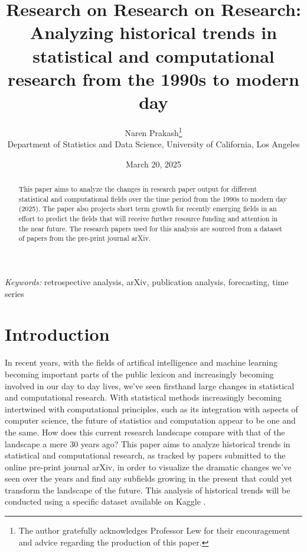\documentclass[
  12pt]{article}
\begin{document}
\def\spacingset#1{\renewcommand{\baselinestretch}%
{#1}\small\normalsize} \spacingset{1}



\date{March 20, 2025}
\title{\bf Research on Research on Research: Analyzing historical trends
in statistical and computational research from the 1990s to modern day}
\author{
Naren Prakash\thanks{The author gratefully acknowledges Professor Lew
for their encouragement and advice regarding the production of this
paper.}\\
Department of Statistics and Data Science, University of California, Los
Angeles\\
}
\maketitle

\bigskip
\bigskip
\begin{abstract}
This paper aims to analyze the changes in research paper output for
different statistical and computational fields over the time period from
the 1990s to modern day (2025). The paper also projects short term
growth for recently emerging fields in an effort to predict the fields
that will receive further resource funding and attention in the near
future. The research papers used for this analysis are sourced from a
dataset of papers from the pre-print journal arXiv.
\end{abstract}

\noindent%
{\it Keywords:} retrospective analysis, arXiv, publication analysis,
forecasting, time series
\vfill

\newpage
\spacingset{1.9} %


\section{Introduction}\label{sec-intro}

In recent years, with the fields of artifical intelligence and machine
learning becoming important parts of the public lexicon and increasingly
becoming involved in our day to day lives, we've seen firsthand large
changes in statistical and computational research. With statistical
methods increasingly becoming intertwined with computational principles,
such as its integration with aspects of computer science, the future of
statistics and computation appear to be one and the same. How does this
current research landscape compare with that of the landscape a mere 30
years ago? This paper aims to analyze historical trends in statistical
and computational research, as tracked by papers submitted to the online
pre-print journal arXiv, in order to visualize the dramatic changes
we've seen over the years and find any subfields growing in the present
that could yet transform the landscape of the future. This analysis of
historical trends will be conducted using a specific dataset available
on Kaggle \citet{arXiv:kaggle:data}.
\end{document}
